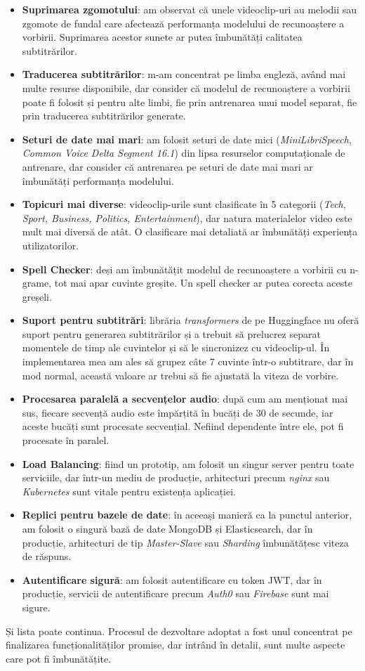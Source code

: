 \begin{itemize}
    \item \textbf{Suprimarea zgomotului}: am observat că unele videoclip-uri au melodii sau 
    zgomote de fundal care afectează performanța modelului de recunoaștere a vorbirii. Suprimarea
    acestor sunete ar putea îmbunătăți calitatea subtitrărilor.
    \item \textbf{Traducerea subtitrărilor}: m-am concentrat pe limba engleză, având mai multe
    resurse disponibile, dar consider că modelul de recunoaștere a vorbirii poate fi folosit
    și pentru alte limbi, fie prin antrenarea unui model separat, fie prin traducerea subtitrărilor
    generate.
    \item \textbf{Seturi de date mai mari}: am folosit seturi de date mici (\textit{MiniLibriSpeech},
    \textit{Common Voice Delta Segment 16.1}) din lipsa resurselor computaționale de antrenare,
    dar consider că antrenarea pe seturi de date mai mari ar îmbunătăți performanța modelului.
    \item \textbf{Topicuri mai diverse}: videoclip-urile sunt clasificate în 5 categorii
    (\textit{Tech, Sport, Business, Politics, Entertainment}), dar natura materialelor video
    este mult mai diversă de atât. O clasificare mai detaliată ar îmbunătăți experiența
    utilizatorilor.
    \item \textbf{Spell Checker}: deși am îmbunătățit modelul de recunoaștere a vorbirii
    cu n-grame, tot mai apar cuvinte greșite. Un spell checker ar putea corecta aceste greșeli.
    \item \textbf{Suport pentru subtitrări}: librăria \textit{transformers} de pe Huggingface nu oferă
    suport pentru generarea subtitrărilor și a trebuit să prelucrez separat momentele de timp
    ale cuvintelor și să le sincronizez cu videoclip-ul. În implementarea mea am ales să grupez
    câte 7 cuvinte într-o subtitrare, dar în mod normal, această valoare ar trebui să fie ajustată
    la viteza de vorbire.
    \item \textbf{Procesarea paralelă a secvențelor audio}: după cum am menționat mai sus,
    fiecare secvență audio este împărțită în bucăți de 30 de secunde, iar aceste bucăți sunt
    procesate secvențial. Nefiind dependente între ele, pot fi procesate în paralel.
    \item \textbf{Load Balancing}: fiind un prototip, am folosit un singur server pentru toate
    serviciile, dar într-un mediu de producție, arhitecturi precum \textit{nginx} sau \textit{Kubernetes}
    sunt vitale pentru existența aplicației.
    \item \textbf{Replici pentru bazele de date}: în aceeași manieră ca la punctul anterior, am folosit
    o singură bază de date MongoDB și Elasticsearch, dar în producție, arhitecturi de tip 
    \textit{Master-Slave} sau \textit{Sharding} îmbunătățesc viteza de răspuns.
    \item \textbf{Autentificare sigură}: am folosit autentificare cu token JWT, dar în producție,
    servicii de autentificare precum \textit{Auth0} sau \textit{Firebase} sunt mai sigure.
\end{itemize}

\par
Și lista poate continua. Procesul de dezvoltare adoptat a fost unul concentrat pe finalizarea
funcționalităților promise, dar intrând în detalii, sunt multe aspecte care pot fi îmbunătățite.
